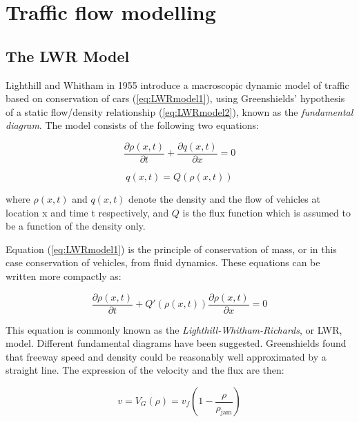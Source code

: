 \documentclass[11pt]{article}
\numberwithin{equation}{section}
\numberwithin{figure}{section}
\numberwithin{table}{section}
\begin{document}
\section{Traffic flow modelling}

\subsection{The LWR Model}

Lighthill and Whitham in 1955 \cite{Lighthill1955} introduce a macroscopic dynamic model of traffic based on conservation of cars (\ref{eq:LWRmodel1}), using Greenshields' hypothesis \cite{Greenshields1934} of a static flow/density relationship (\ref{eq:LWRmodel2}), known as the \textit{fundamental diagram}. The model consists of the following two equations:

\begin{equation} \label{eq:LWRmodel1}
\frac{\partial \rho(x,t)}{\partial t} + \frac{\partial q(x,t)}{\partial x} = 0
\end{equation}

\begin{equation} \label{eq:LWRmodel2}
q(x,t) = Q(\rho(x,t))
\end{equation}

\noindent where $\rho(x,t)$ and $q(x,t)$ denote the density and the flow of vehicles at location x and time t respectively, and $Q$ is the flux function which is assumed to be a function of the density only. 

Equation (\ref{eq:LWRmodel1}) is the principle of conservation of mass, or in this case conservation of vehicles, from fluid dynamics. These equations can be written more compactly as:

\begin{equation} \label{eq:LWRmodel3}
\frac{\partial \rho(x,t)}{\partial t} + Q'(\rho(x,t))\frac{\partial \rho(x,t)}{\partial x} = 0
\end{equation}

This equation is commonly known as the \textit{Lighthill-Whitham-Richards}, or LWR, model. Different fundamental diagrams have been suggested. Greenshields \cite{Greenshields1934} found that freeway speed and density could be reasonably well approximated by a straight line. The expression of the velocity and the flux are then:

\begin{equation} \label{eq:greenshieldsVelocity}
v = V_{G}(\rho) = v_{f}(1-\frac{\rho}{\rho_{\text{jam}}})
\end{equation}
\end{document}
